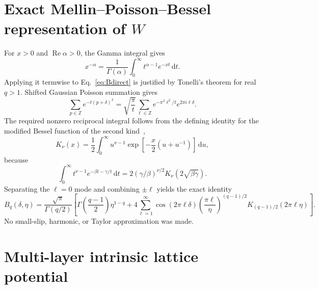 \documentclass[11pt,letterpaper]{article}
\newcommand{\dd}{\,\mathrm d}
\begin{document}
\section{Exact Mellin--Poisson--Bessel representation of $W$}
\label{sec:mellin}

For $x>0$ and $\operatorname{Re}\alpha>0$, the Gamma integral gives
\begin{equation}
 x^{-\alpha}=\frac1{\Gamma(\alpha)}
 \int_0^\infty t^{\alpha-1}e^{-xt}\dd t.
 \label{eq:mellin}
\end{equation}
Applying it termwise to Eq.~\eqref{eq:Bdirect} is justified by Tonelli's
theorem for real $q>1$.  Shifted Gaussian Poisson summation gives
\begin{equation}
 \sum_{p\in\mathbb Z}e^{-t(p+\delta)^2}
 =\sqrt{\frac\pi t}\sum_{\ell\in\mathbb Z}
 e^{-\pi^2\ell^2/t}e^{2\pi i\ell\delta}.
 \label{eq:poisson}
\end{equation}
The required nonzero reciprocal integral follows from the defining identity
for the modified Bessel function of the second kind~\cite{DLMFBessel},
\begin{equation}
 \boxed{K_\nu(x)=\frac12\int_0^\infty
 u^{\nu-1}\exp\!\left[-\frac x2(u+u^{-1})\right]\dd u,}
 \label{eq:Kdef}
\end{equation}
because
\begin{equation}
 \int_0^\infty t^{\nu-1}e^{-\beta t-\gamma/t}\dd t
 =2(\gamma/\beta)^{\nu/2}K_\nu(2\sqrt{\beta\gamma}).
\end{equation}
Separating the $\ell=0$ mode and combining $\pm\ell$ yields the exact identity
\begin{equation}
\boxed{B_q(\delta,\eta)=\frac{\sqrt\pi}{\Gamma(q/2)}\left[
 \Gamma\!\left(\frac{q-1}{2}\right)\eta^{1-q}
 +4\sum_{\ell=1}^{\infty}\cos(2\pi\ell\delta)
 \left(\frac{\pi\ell}{\eta}\right)^{(q-1)/2}
 K_{(q-1)/2}(2\pi\ell\eta)\right].}
\label{eq:Bbessel}
\end{equation}
No small-slip, harmonic, or Taylor approximation was made.

\section{Multi-layer intrinsic lattice potential}
\label{sec:H}
\end{document}
